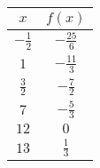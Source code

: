 \begin{tabular}{cc} \toprule
$x$            & $f(x)$          \\\midrule
$-\frac{1}{2}$ & $-\frac{25}{6}$ \\[6pt]
$1$            & $-\frac{11}{3}$ \\[6pt]
$\frac{3}{2}$  & $-\frac{7}{2}$  \\[6pt]
$7$            & $-\frac{5}{3}$  \\[6pt]
$12$           & $0$             \\[6pt]
$13$           & $\frac{1}{3}$   \\\bottomrule
\end{tabular}
